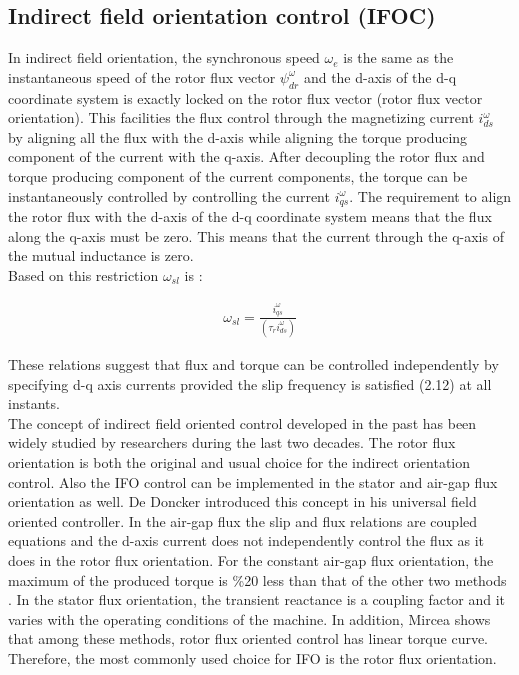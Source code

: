 \subsection{Indirect field orientation control (IFOC)}


In indirect field orientation, the synchronous speed $\omega_{e}$ is the same as the instantaneous speed of the rotor flux vector $\psi_{dr}^{\omega}$ and the d-axis of the d-q coordinate system is exactly locked on the rotor flux vector (rotor flux vector orientation). This facilities the flux control through the magnetizing current $i_{ds}^{\omega}$ by aligning all the flux with the d-axis while aligning the torque producing component of the current with the q-axis. After decoupling the rotor flux and torque producing component of the current components, the torque can be instantaneously controlled by controlling the current $i_{qs}^{\omega}$. The requirement to align the rotor flux with the d-axis of the d-q coordinate system means that the flux along the q-axis must be zero. This means that the current through the q-axis of the mutual inductance is zero.\\

Based on this restriction $\omega_{sl}$ is :

\begin{align}
\omega_{sl}=\frac{i_{qs}^{\omega}}{(\tau_{r}i_{ds}^{\omega})}
\end{align}

These relations suggest that flux and torque can be controlled independently by specifying d-q axis currents provided the slip frequency is satisfied (2.12) at all instants.\\


The concept of indirect field oriented control developed in the past has been widely studied by researchers during the last two decades. The rotor flux orientation is both the original and usual choice for the indirect orientation control. Also the IFO control can be implemented in the stator and air-gap flux orientation as well. De Doncker \cite{doncker} introduced this concept in his universal field oriented controller. In the air-gap flux the slip and flux relations are coupled equations and the d-axis current does not independently control the flux as it does in the rotor flux orientation. For the constant air-gap flux orientation, the maximum of the produced torque is \%20 less than that of the other two methods \cite{sul}. In the stator flux orientation, the transient reactance is a coupling factor and it varies with the operating conditions of the machine. In addition, Mircea \cite{mirc} shows that among these methods, rotor flux oriented control has linear torque curve. Therefore, the most commonly used choice for IFO is the rotor flux orientation.\\

